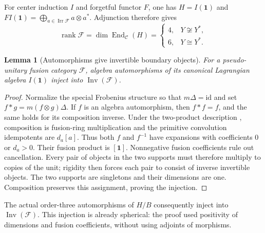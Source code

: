 \documentclass[11pt,a4paper]{article}
\newtheorem{lemma}[theorem]{Lemma}
\theoremstyle{definition}
\begin{document}
For center induction $I$ and forgetful functor $F$, one has $H=I(\mathbf1)$
and $FI(\mathbf1)=\bigoplus_{a\in\operatorname{Irr}\mathcal F}a\otimes a^*$.
Adjunction therefore gives
\begin{equation}
 \operatorname{rank}\mathcal F
 =\dim\operatorname{End}_{\mathcal C}(H)
 =\begin{cases}4,&Y\not\cong Y^*,\\6,&Y\cong Y^*.
 \end{cases}
 \label{eq:rank-fork}
\end{equation}
\begin{lemma}[Automorphisms give invertible boundary objects]
\label{lem:automorphisms-invertibles}
For a pseudo-unitary fusion category $\mathcal F$, algebra
automorphisms of its canonical Lagrangian algebra $I(\mathbf1)$ inject
into $\operatorname{Inv}(\mathcal F)$.
\end{lemma}
\begin{proof}
Normalize the special Frobenius structure so that
$m\Delta=\mathrm{id}$ and set $f*g=m(f\otimes g)\Delta$.
If $f$ is an algebra automorphism, then $f*f=f$, and the same holds
for its composition inverse. Under the two-product description
\cite[Lemma~3.1 and Corollary~3.4]{BJ}, composition is fusion-ring
multiplication and the primitive convolution idempotents are
$d_a[a]$. Thus both $f$ and $f^{-1}$ have expansions with coefficients
$0$ or $d_a>0$. Their fusion product is $[\mathbf1]$.
Nonnegative fusion coefficients rule out cancellation. Every pair of
objects in the two supports must therefore multiply to copies of the
unit; rigidity then forces each pair to consist of inverse invertible
objects. The two supports are singletons and their dimensions are
one. Composition preserves this assignment, proving the injection.
\end{proof}

The actual order-three automorphisms of $H/B$ consequently inject into
$\operatorname{Inv}(\mathcal F)$. This injection is already spherical:
the proof used positivity of dimensions and fusion coefficients,
without using adjoints of morphisms.
\end{document}
